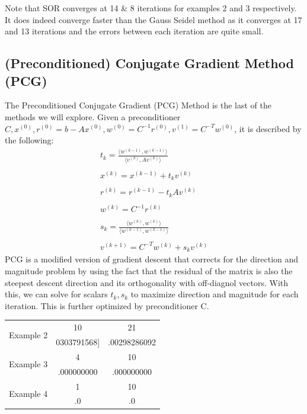 \documentclass[11pt]{article}	%
\begin{document}
Note that SOR converges at 14 \& 8 iterations for examples 2 and 3 respectively. It does indeed converge faster than the Gauss Seidel method as it converges at 17 and 13 iterations and the errors between each iteration are quite small.


\subsection{(Preconditioned) Conjugate Gradient Method (PCG)}
The Preconditioned Conjugate Gradient (PCG) Method is the last of the methods we will explore. Given a preconditioner $C, x^{(0)}, r^{(0)} = b - Ax^{(0)}, w^{(0)} = C^{-1}r^{(0)}, v^{(1)} = C^{-T}w^{(0)}$, it is described by the following:
\begin{align*}\label{eq:precondition-conj-grad-eq-1}
    t_k = \frac{\langle w^{(k-1)}, w^{(k-1)}\rangle}{\langle v^{(k)}, Av^{(k)}\rangle} \\\\
    x^{(k)} = x^{(k-1)} + t_kv^{(k)} \\\\
    r^{(k)} = r^{(k-1)} - t_kAv^{(k)} \\\\
    w^{(k)} = C^{-1}r^{(k)} \\\\
    s_k = \frac{\langle w^{(k)}, w^{(k)}\rangle}{\langle w^{(k-1)}, w^{(k-1)}\rangle} \\\\
    v^{(k+1)} = C^{-T}w^{(k)} + s_kv^{(k)}
\end{align*}
PCG is a modified version of gradient descent that corrects for the direction and magnitude problem by using the fact that the residual of the matrix is also the steepest descent direction and its orthogonality with off-diagnol vectors. With this, we can solve for scalars $t_k, s_k$ to maximize direction and magnitude for each iteration. This is further optimized by preconditioner C.

\begin{center}
    \begin{tabular}{||c|c|c||}
        \hline
        \multirow{2}{5em}{Example 2} & 10 & 21 \\ [.25em]
        & 0303791568] & .00298286092\\ [.25em]
        \hline\hline
        \multirow{2}{5em}{Example 3} & 4 & 10 \\ [.25em]
        & .000000000 & .000000000 \\ [.25em]
        \hline
        \multirow{2}{5em}{Example 4} & 1 & 10 \\ [.25em]
        & .0 & .0 \\ [.25em]
        \hline
    \end{tabular}
\end{center}
\end{document}
